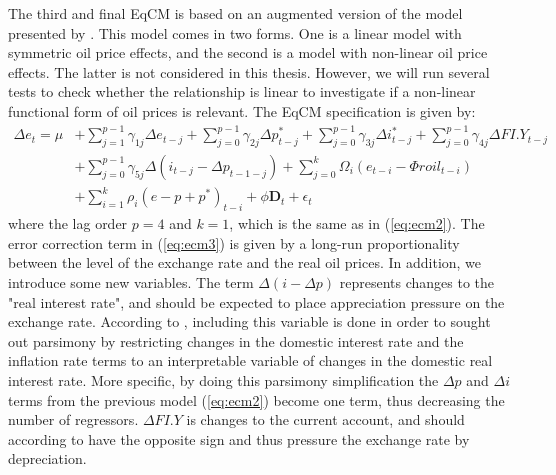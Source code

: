 \documentclass[10pt]{article}
\numberwithin{equation}{section}
\numberwithin{table}{section}
\numberwithin{figure}{section}
\begin{document}
\begin{spacing}{1.5}
\indent The third and final EqCM is based on an augmented version of the model presented by \cite{akram2000does,akram2004oil}. This model comes in two forms. One is a linear model with symmetric oil price effects, and the second is a model with non-linear oil price effects. The latter is not considered in this thesis. However, we will run several tests to check whether the relationship is linear to investigate if a non-linear functional form of oil prices is relevant. The EqCM specification is given by: 
\begin{align}
\nonumber    \Delta e_t = \mu &+ \sum_{j=1}^{p-1} \gamma_{1j} \Delta e_{t-j} + \sum_{j=0}^{p-1} \gamma_{2j} \Delta p^*_{t-j} + \sum_{j=0}^{p-1} \gamma_{3j} \Delta i_{t-j}^* + \sum_{j=0}^{p-1} \gamma_{4j} \Delta FI.Y_{t-j} \\\nonumber
&+ \sum_{j=0}^{p-1}\gamma_{5j}\Delta \left(i_{t-j} - \Delta p_{t-1-j} \right) + \sum_{j=0}^{k}\Omega_{i}\left(e_{t-i} - \Phi roil_{t-i} \right)\\ 
&+ \sum_{i=1}^k\rho_i\left(e - p + p^* \right)_{t-i} + \phi \mathbf{D}_t + \epsilon_t
    \label{eq:ecm3}
\end{align}
where the lag order $p = 4$ and $k = 1$, which is the same as in (\ref{eq:ecm2}). The error correction term in (\ref{eq:ecm3}) is given by a long-run proportionality between the level of the exchange rate and the real oil prices. In addition, we introduce some new variables. The term $ \Delta (i - \Delta p)$ represents changes to the "real interest rate", and should be expected to place appreciation pressure on the exchange rate. According to \cite{akram2000does, akram2004oil}, including this variable is done in order to sought out parsimony by restricting changes in the domestic interest rate and the inflation rate terms to an interpretable variable of changes in the domestic real interest rate. More specific, by doing this parsimony simplification the $\Delta p$ and $\Delta i$ terms from the previous model (\ref{eq:ecm2}) become one term, thus decreasing the number of regressors. $\Delta FI.Y$ is changes to the current account, and should according to \cite{hooper1982fluctuations} have the opposite sign and thus pressure the exchange rate by depreciation.\\  

\end{spacing}
\end{document}
